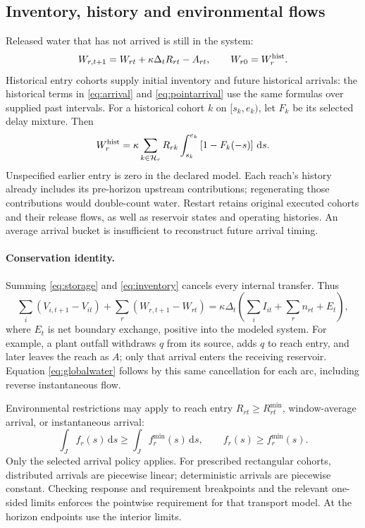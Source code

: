 \documentclass[10pt,a4paper]{article}
\newcommand{\dd}{\,\mathrm{d}}
\begin{document}
\subsection{Inventory, history and environmental flows}

Released water that has not arrived is still in the system:
\begin{equation}
W_{r,t+1}=W_{rt}+\kappa\Delta_t R_{rt}-A_{rt},\qquad
W_{r0}=W_r^{\rm hist}.
\label{eq:inventory}
\end{equation}
Historical entry cohorts supply initial inventory and future historical
arrivals: the historical terms in \eqref{eq:arrival} and
\eqref{eq:pointarrival} use the same formulas over supplied past intervals.
For a historical cohort $k$ on $[s_k,e_k)$, let $F_k$ be its selected delay
mixture. Then
\begin{equation}
W_r^{\rm hist}=\kappa\sum_{k\in\mathcal H_r}R_{rk}
\int_{s_k}^{e_k}\left[1-F_k(-s)\right]\dd s.
\label{eq:historyinventory}
\end{equation}
Unspecified earlier entry is zero in the declared model.
Each reach's history already includes its pre-horizon upstream
contributions; regenerating those contributions would double-count water.
Restart retains original executed cohorts and their release flows, as well
as reservoir states and operating histories. An average arrival bucket is
insufficient to reconstruct future arrival timing.

\paragraph{Conservation identity.}
Summing \eqref{eq:storage} and \eqref{eq:inventory} cancels every internal
transfer. Thus
\begin{equation}
\sum_i(V_{i,t+1}-V_{it})+\sum_r(W_{r,t+1}-W_{rt})
=\kappa\Delta_t\left(\sum_i I_{it}+\sum_r n_{rt}+E_t\right),
\label{eq:globalwater}
\end{equation}
where $E_t$ is net boundary exchange, positive into the modeled system.
For example, a plant outfall withdraws $q$ from its source, adds $q$ to reach
entry, and later leaves the reach as $A$; only that arrival enters the
receiving reservoir. Equation \eqref{eq:globalwater} follows by this same
cancellation for each arc, including reverse instantaneous flow.

Environmental restrictions may apply to reach entry $R_{rt}\ge R_{rt}^{\min}$,
window-average arrival, or instantaneous arrival:
\begin{equation}
\int_J f_r(s)\dd s\ge\int_J f_r^{\min}(s)\dd s,\qquad
f_r(s)\ge f_r^{\min}(s).
\label{eq:environment}
\end{equation}
Only the selected arrival policy applies. For prescribed rectangular cohorts,
distributed arrivals are piecewise linear; deterministic arrivals are
piecewise constant. Checking response and requirement breakpoints and the relevant one-sided
limits enforces the pointwise requirement for that transport model.
At the horizon endpoints use the interior limits.
\end{document}
